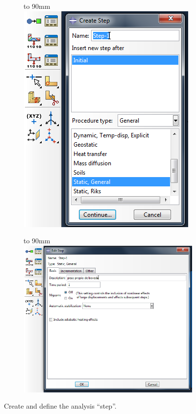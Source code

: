 \documentclass[spanish,a4paper,12pt]{article}
\def\imagebox#1#2{\vtop to #1{\null\hbox{#2}\vfill}}
\begin{document}
\begin{figure}[h!tp]
\centering
\captionsetup[subfigure]{justification=centering,singlelinecheck=false}
  \begin{subfigure}[b]{0.35\textwidth}
  \hspace{10mm}
    \imagebox{90mm}{\includegraphics[scale=0.4]{capturas/15-step.png}}
  \end{subfigure}
  \begin{subfigure}[b]{0.64\textwidth}
  \hspace{6mm}
    \imagebox{90mm}{\includegraphics[scale=0.4]{capturas/16-step.png}}
  \end{subfigure}
\caption{Create and define the analysis ``step''.}
\label{fig:step}
\end{figure}
\end{document}
